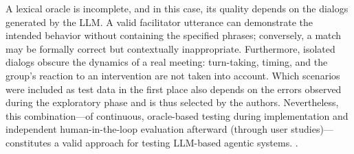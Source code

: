 A lexical oracle is incomplete, and in this case, its quality depends on the dialogs generated by the LLM.
A valid facilitator utterance can demonstrate the intended behavior without containing the specified phrases;
conversely, a match may be formally correct but contextually inappropriate.
Furthermore, isolated dialogs obscure the dynamics of a real meeting: turn-taking, timing, and the group’s
reaction to an intervention are not taken into account.
Which scenarios were included as test data in the first place also depends on the errors observed during the
exploratory phase and is thus selected by the authors.
Nevertheless, this combination—of continuous, oracle-based testing during implementation and independent
human-in-the-loop evaluation afterward (through user studies)—constitutes a valid approach for testing
LLM-based agentic systems. \cite[pp.~6--7]{mohammadiEvaluationBenchmarkingLLM2025}.

